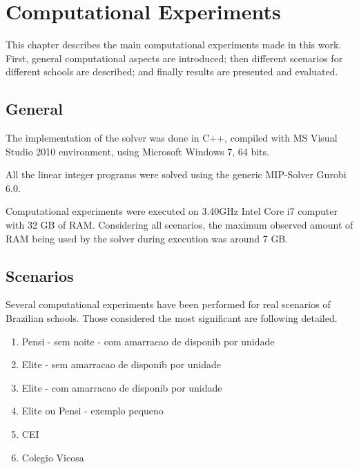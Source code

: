 \chapter{Computational Experiments}
\label{chap:experiments}


This chapter describes the main computational experiments made in this work. First, general computational aspects are introduced; then different scenarios for different schools are described; and finally results are presented and evaluated.


\section{General}

The implementation of the solver was done in C++, compiled with MS Visual Studio 2010 environment, using Microsoft Windows 7, 64 bits.

All the linear integer programs were solved using the generic MIP-Solver Gurobi 6.0. 

Computational experiments were executed on 3.40GHz Intel Core i7 computer with 32 GB of RAM. Considering all scenarios, the maximum observed amount of RAM being used by the solver during execution was around 7 GB.


\section{Scenarios}

Several computational experiments have been performed for real scenarios of Brazilian schools. Those considered the most significant are following detailed.

\begin{enumerate}
\item Pensi - sem noite - com amarracao de disponib por unidade

\item Elite - sem amarracao de disponib por unidade

\item Elite - com amarracao de disponib por unidade

\item Elite ou Pensi - exemplo pequeno

\item CEI

\item Colegio Vicosa

\end{enumerate}


